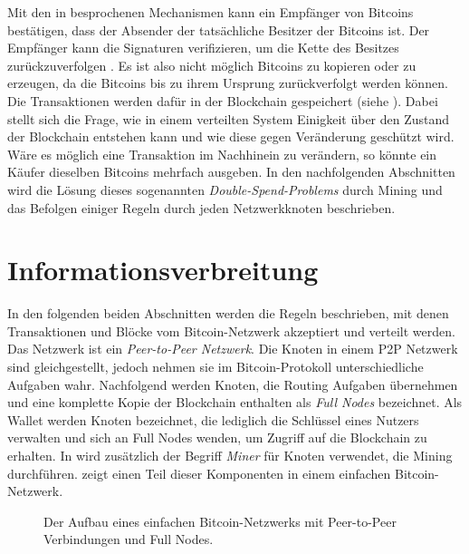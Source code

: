 \documentclass[ngerman,runningheads,a4paper]{llncs}[2018/03/10]
\begin{document}
Mit den in  besprochenen Mechanismen kann ein Empfänger von Bitcoins bestätigen, dass der Absender der tatsächliche Besitzer der Bitcoins ist. Der Empfänger kann die Signaturen verifizieren, um die Kette des Besitzes zurückzuverfolgen \citep{bitcoinPDF}. Es ist also nicht möglich Bitcoins zu kopieren oder zu erzeugen, da die Bitcoins bis zu ihrem Ursprung zurückverfolgt werden können. Die Transaktionen werden dafür in der Blockchain gespeichert (siehe ). Dabei stellt sich die Frage, wie in einem verteilten System Einigkeit über den Zustand der Blockchain entstehen kann und wie diese gegen Veränderung geschützt wird. Wäre es möglich eine Transaktion im Nachhinein zu verändern, so könnte ein Käufer dieselben Bitcoins mehrfach ausgeben. In den nachfolgenden Abschnitten wird die Lösung dieses sogenannten \textit{Double-Spend-Problems} durch Mining und das Befolgen einiger Regeln durch jeden Netzwerkknoten beschrieben.


\section{Informationsverbreitung}\label{sec:informationsverbreitung}

In den folgenden beiden Abschnitten werden die Regeln beschrieben, mit denen Transaktionen und Blöcke vom Bitcoin-Netzwerk akzeptiert und verteilt werden. Das Netzwerk ist ein \textit{Peer-to-Peer Netzwerk}. Die Knoten in einem P2P Netzwerk sind gleichgestellt, jedoch nehmen sie im Bitcoin-Protokoll unterschiedliche Aufgaben wahr. Nachfolgend werden Knoten, die Routing Aufgaben übernehmen und eine komplette Kopie der Blockchain enthalten als \textit{Full Nodes} bezeichnet. Als Wallet werden Knoten bezeichnet, die lediglich die Schlüssel eines Nutzers verwalten und sich an Full Nodes wenden, um Zugriff auf die Blockchain zu erhalten. In  wird zusätzlich der Begriff \textit{Miner} für Knoten verwendet, die Mining durchführen.  zeigt einen Teil dieser Komponenten in einem einfachen Bitcoin-Netzwerk. 


\begin{figure}
  \centering
  \caption{Der Aufbau eines einfachen Bitcoin-Netzwerks mit Peer-to-Peer Verbindungen und Full Nodes.}
  \label{fig:basicNetwork}
\end{figure}
\end{document}
